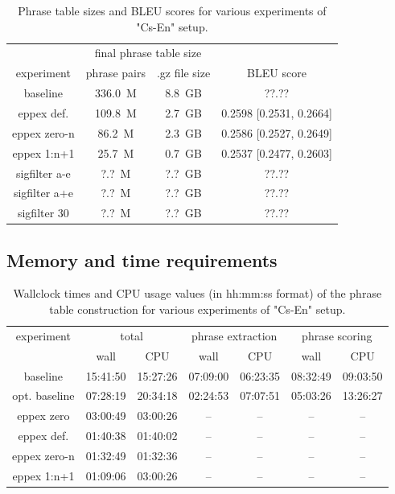 \begin{table}[ht]
\centering
\begin{tabular}{ | c | c c | c | }
\hline
 & \multicolumn{2}{|c|}{final phrase table size} & \\
experiment & phrase pairs & .gz file size & BLEU score \\
\hline
\hline
baseline        & 336.0~M & 8.8~GB & ??.?? \\ %
eppex def.      & 109.8~M & 2.7~GB & 0.2598 [0.2531, 0.2664] \\
eppex zero-n    &  86.2~M & 2.3~GB & 0.2586 [0.2527, 0.2649] \\
eppex 1:n+1     &  25.7~M & 0.7~GB & 0.2537 [0.2477, 0.2603] \\
sigfilter a-e   &   ?.?~M & ?.?~GB & ??.?? \\ %
sigfilter a+e   &   ?.?~M & ?.?~GB & ??.?? \\ %
sigfilter 30    &   ?.?~M & ?.?~GB & ??.?? \\ %
\hline
\end{tabular}
\caption{\label{cs-en-wmt13-pt-size-and-bleu}Phrase table sizes and BLEU scores
for various experiments of "Cs-En" setup.}
\end{table}

\subsection{Memory and time requirements}

\begin{table}[ht]
\centering
\begin{tabular}{ | c | c c | c c | c c | }
\hline
experiment & \multicolumn{2}{|c|}{total} & \multicolumn{2}{|c|}{phrase extraction} & \multicolumn{2}{|c|}{phrase scoring} \\
 & wall & CPU & wall & CPU & wall & CPU \\
\hline
\hline
baseline      & 15:41:50 & 15:27:26 & 07:09:00 & 06:23:35 & 08:32:49 & 09:03:50 \\
opt. baseline & 07:28:19 & 20:34:18 & 02:24:53 & 07:07:51 & 05:03:26 & 13:26:27 \\
eppex zero    & 03:00:49 & 03:00:26 & -- & -- & -- & -- \\
\hline
eppex def.    & 01:40:38 & 01:40:02 & -- & -- & -- & -- \\
eppex zero-n  & 01:32:49 & 01:32:36 & -- & -- & -- & -- \\
eppex 1:n+1   & 01:09:06 & 03:00:26 & -- & -- & -- & -- \\
\hline
\end{tabular}
\caption{\label{cs-en-wmt13-time-benchmarks}Wallclock times and CPU usage values
(in hh:mm:ss format) of the phrase table construction for various experiments
of "Cs-En" setup.}
\end{table}


